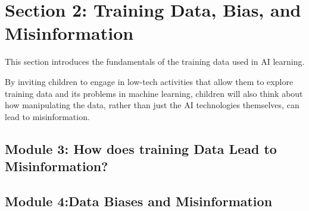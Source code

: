 \documentclass{article}
\begin{document}
\section*{\centering Section 2: Training Data, Bias, and Misinformation}
%

This section introduces the fundamentals of the training data used in AI learning. 

By inviting children to engage in low-tech activities that allow them to explore training data and its problems in machine learning, children will also think about how manipulating the data, rather than just the AI technologies themselves, can lead to misinformation.  

\vspace*{\fill}
\newpage
\subsection*{\centering Module 3: How does training Data Lead to Misinformation?}
%


\newpage
\subsection*{\centering Module 4:Data Biases and Misinformation}
%


\end{document}
